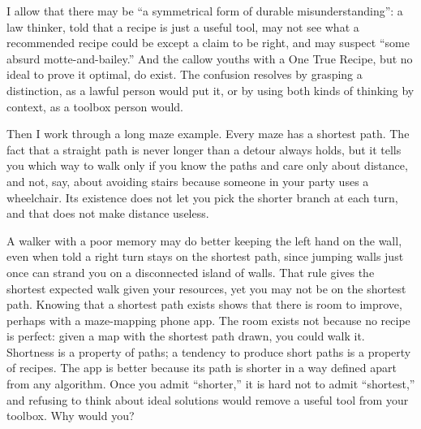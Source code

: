 I allow that there may be ``a symmetrical form of durable misunderstanding'': a law thinker, told that a recipe is just a useful tool, may not see what a recommended recipe could be except a claim to be right, and may suspect ``some absurd motte-and-bailey.'' And the callow youths with a One True Recipe, but no ideal to prove it optimal, do exist. The confusion resolves by grasping a distinction, as a lawful person would put it, or by using both kinds of thinking by context, as a toolbox person would.

Then I work through a long maze example. Every maze has a shortest path. The fact that a straight path is never longer than a detour always holds, but it tells you which way to walk only if you know the paths and care only about distance, and not, say, about avoiding stairs because someone in your party uses a wheelchair. Its existence does not let you pick the shorter branch at each turn, and that does not make distance useless.

A walker with a poor memory may do better keeping the left hand on the wall, even when told a right turn stays on the shortest path, since jumping walls just once can strand you on a disconnected island of walls. That rule gives the shortest expected walk given your resources, yet you may not be on the shortest path. Knowing that a shortest path exists shows that there is room to improve, perhaps with a maze-mapping phone app. The room exists not because no recipe is perfect: given a map with the shortest path drawn, you could walk it. Shortness is a property of paths; a tendency to produce short paths is a property of recipes. The app is better because its path is shorter in a way defined apart from any algorithm. Once you admit ``shorter,'' it is hard not to admit ``shortest,'' and refusing to think about ideal solutions would remove a useful tool from your toolbox. Why would you? 

